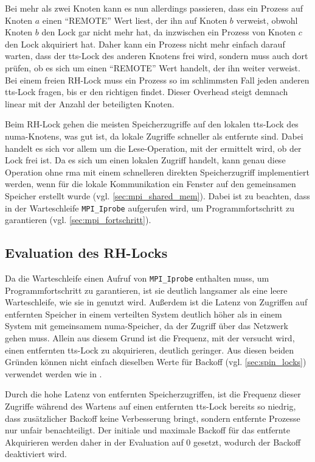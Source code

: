 Bei mehr als zwei Knoten kann es nun allerdings passieren,
dass ein Prozess auf Knoten $a$ einen \enquote{REMOTE} Wert liest,
der ihn auf Knoten $b$ verweist,
obwohl Knoten $b$ den Lock gar nicht mehr hat,
da inzwischen ein Prozess von Knoten $c$ den Lock akquiriert hat.
Daher kann ein Prozess nicht mehr einfach darauf warten,
dass der \gls{tts}-Lock des anderen Knotens frei wird,
sondern muss auch dort prüfen,
ob es sich um einen \enquote{REMOTE} Wert handelt,
der ihn weiter verweist.
Bei einem freien RH-Lock muss ein Prozess so im schlimmsten Fall jeden anderen \gls{tts}-Lock fragen,
bis er den richtigen findet.
Dieser Overhead steigt demnach linear mit der Anzahl der beteiligten Knoten.

Beim RH-Lock gehen die meisten Speicherzugriffe auf den lokalen \gls{tts}-Lock des \gls{numa}-Knotens,
was gut ist,
da lokale Zugriffe schneller als entfernte sind.
Dabei handelt es sich vor allem um die Lese-Operation,
mit der ermittelt wird,
ob der Lock frei ist.
Da es sich um einen lokalen Zugriff handelt,
kann genau diese Operation ohne \gls{rma} mit einem schnelleren direkten Speicherzugriff implementiert werden,
wenn für die lokale Kommunikation ein \gls{Fenster} auf den gemeinsamen Speicher erstellt wurde
(vgl. \autoref{sec:mpi_shared_mem}).
Dabei ist zu beachten,
dass in der Warteschleife \texttt{MPI\_Iprobe} aufgerufen wird,
um Programmfortschritt zu garantieren (vgl. \autoref{sec:mpi_fortschritt}).

\subsection{Evaluation des RH-Locks}

Da die Warteschleife einen Aufruf von \texttt{MPI\_Iprobe} enthalten muss,
um Programmfortschritt zu garantieren,
ist sie deutlich langsamer
als eine leere Warteschleife,
wie sie in \cite{RH-Lock} genutzt wird.
Außerdem ist die Latenz von Zugriffen auf entfernten Speicher
in einem verteilten System deutlich höher
als in einem System mit gemeinsamem \gls{numa}-Speicher,
da der Zugriff über das Netzwerk gehen muss.
Allein aus diesem Grund ist die Frequenz,
mit der versucht wird,
einen entfernten \gls{tts}-Lock zu akquirieren,
deutlich geringer.
Aus diesen beiden Gründen können nicht einfach dieselben Werte für Backoff (vgl. \autoref{sec:spin_locks}) verwendet werden
wie in \cite{RH-Lock}.

Durch die hohe Latenz von entfernten Speicherzugriffen,
ist die Frequenz dieser Zugriffe während des Wartens auf einen entfernten \gls{tts}-Lock bereits so niedrig,
dass zusätzlicher Backoff keine Verbesserung bringt,
sondern entfernte Prozesse nur unfair benachteiligt.
Der initiale und maximale Backoff für das entfernte Akquirieren werden daher in der Evaluation auf 0 gesetzt,
wodurch der Backoff deaktiviert wird.

